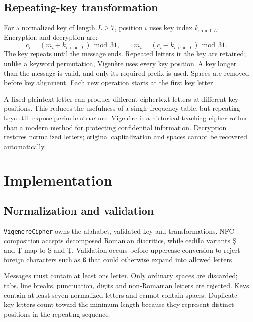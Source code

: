 \documentclass{utmreport}
\begin{document}
\section{Repeating-key transformation}
For a normalized key of length $L\geq7$, position $i$ uses key index $k_{i\bmod L}$. Encryption and decryption are:
\begin{equation}
 c_i=(m_i+k_{i\bmod L})\bmod31,\qquad
 m_i=(c_i-k_{i\bmod L})\bmod31.
\end{equation}
The key repeats until the message ends. Repeated letters in the key are retained; unlike a keyword permutation, Vigenère uses every key position. A key longer than the message is valid, and only its required prefix is used. Spaces are removed before key alignment. Each new operation starts at the first key letter.

A fixed plaintext letter can produce different ciphertext letters at different key positions. This reduces the usefulness of a single frequency table, but repeating keys still expose periodic structure. Vigenère is a historical teaching cipher rather than a modern method for protecting confidential information. Decryption restores normalized letters; original capitalization and spaces cannot be recovered automatically.

\chapter{Implementation}
\section{Normalization and validation}
\texttt{VigenereCipher} owns the alphabet, validated key and transformations. NFC composition accepts decomposed Romanian diacritics, while cedilla variants Ş and Ţ map to Ș and Ț. Validation occurs before uppercase conversion to reject foreign characters such as ß that could otherwise expand into allowed letters.

Messages must contain at least one letter. Only ordinary spaces are discarded; tabs, line breaks, punctuation, digits and non-Romanian letters are rejected. Keys contain at least seven normalized letters and cannot contain spaces. Duplicate key letters count toward the minimum length because they represent distinct positions in the repeating sequence.
\end{document}
